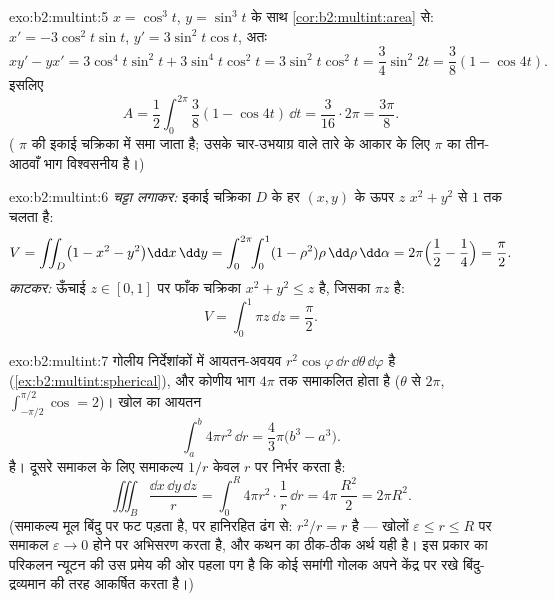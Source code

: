 \begin{solution}{exo:b2:multint:5}
$x = \cos^3 t$, $y = \sin^3 t$ के साथ \cref{cor:b2:multint:area} से: $x' = -3\cos^2 t\sin t$, $y' = 3\sin^2 t\cos t$, अतः
\[
xy' - yx' = 3\cos^4 t\sin^2 t + 3\sin^4 t\cos^2 t
= 3\sin^2 t\cos^2 t = \frac{3}{4}\sin^2 2t
= \frac{3}{8}(1 - \cos 4t) .
\]
इसलिए
\[
A = \frac12\int_0^{2\pi}\frac38(1 - \cos 4t)\,\dd t
= \frac{3}{16}\cdot 2\pi = \frac{3\pi}{8} .
\]
(  $\pi$ की इकाई चक्रिका में समा जाता है; उसके
चार-उभयाग्र वाले तारे के आकार के लिए $\pi$ का तीन-आठवाँ भाग
विश्वसनीय है।)
\end{solution}

\begin{solution}{exo:b2:multint:6}
\emph{चट्टा लगाकर:} इकाई चक्रिका $D$ के हर $(x, y)$ के ऊपर $z$ $x^2 + y^2$ से
$1$ तक चलता है:
\[
V = \iint_D \bigl(1 - x^2 - y^2\bigr)\dd x\,\dd y
= \int_0^{2\pi}\!\!\int_0^1 (1 - \rho^2)\rho\,\dd\rho\,\dd\alpha
= 2\pi\Bigl(\frac12 - \frac14\Bigr) = \frac\pi2 .
\]
\emph{काटकर:} ऊँचाई $z \in [0, 1]$ पर फाँक चक्रिका $x^2 + y^2 \leq z$ है, जिसका 
$\pi z$ है:
\[
V = \int_0^1 \pi z\,\dd z = \frac\pi2 .
\]
\end{solution}

\begin{solution}{exo:b2:multint:7}
गोलीय निर्देशांकों में आयतन-अवयव
$r^2\cos\varphi\,\dd r\,\dd\theta\,\dd\varphi$
है (\cref{ex:b2:multint:spherical}), और कोणीय भाग $4\pi$ तक समाकलित होता है ($\theta$ से $2\pi$,
$\int_{-\pi/2}^{\pi/2}\cos = 2$)। खोल का आयतन
\[
\int_a^b 4\pi r^2\,\dd r = \frac43\pi\bigl(b^3 - a^3\bigr).
\]
है। दूसरे समाकल के लिए समाकल्य $1/r$ केवल $r$ पर निर्भर करता है:
\[
\iiint_B \frac{\dd x\,\dd y\,\dd z}{r}
= \int_0^R 4\pi r^2\cdot\frac1r\,\dd r
= 4\pi\,\frac{R^2}{2} = 2\pi R^2 .
\]
(समाकल्य मूल बिंदु पर फट पड़ता है, पर हानिरहित ढंग से: $r^2/r = r$ 
है --- खोलों $\varepsilon \leq r
\leq R$ पर समाकल $\varepsilon \to 0$ होने पर अभिसरण करता है, और कथन का
ठीक-ठीक अर्थ यही है। इस प्रकार का परिकलन न्यूटन की उस प्रमेय की ओर
पहला पग है कि कोई समांगी गोलक अपने केंद्र पर रखे बिंदु-द्रव्यमान की
तरह आकर्षित करता है।)
\end{solution}

